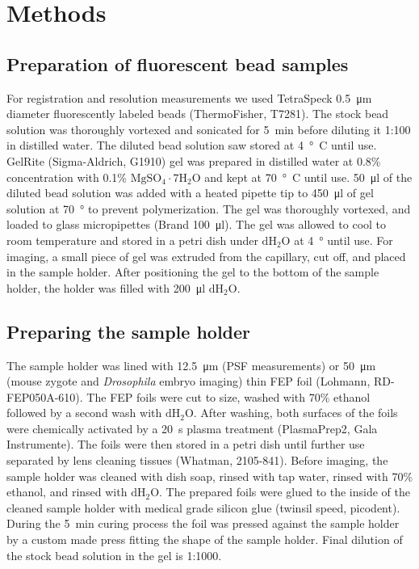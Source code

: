   



\section{Methods}
    \label{sec:methods2}

  \subsection{Preparation of fluorescent bead samples}
    \label{sec:beads}
    For registration and resolution measurements we used TetraSpeck \SI{0.5}{\micro m} diameter fluorescently labeled beads (ThermoFisher, T7281). The stock bead solution was thoroughly vortexed and sonicated for \SI{5}{min} before diluting it 1:100 in distilled water. The diluted bead solution saw stored at \SI{4}{\degree C} until use. GelRite (Sigma-Aldrich, G1910) gel was prepared in distilled water at 0.8\% concentration with 0.1\% $\mathrm{MgSO_4\cdot 7 H_2O}$ and kept at \SI{70}{\degree C} until use. \SI{50}{\micro l} of the diluted bead solution was added with a heated pipette tip to \SI{450}{\micro l} of gel solution at \SI{70}{\degree} to prevent  polymerization. The gel was thoroughly vortexed, and loaded to glass micropipettes (Brand \SI{100}{\micro l}). The gel was allowed to cool to room temperature and stored in a petri dish under $\mathrm{dH_2O}$ at \SI{4}{\degree} until use. For imaging, a small piece of gel was extruded from the capillary, cut off, and placed in the sample holder. After positioning the gel to the bottom of the sample holder, the holder was filled with \SI{200}{\micro l} $\mathrm{dH_2O}$.

  \subsection{Preparing the sample holder}
    The sample holder was lined with \SI{12.5}{\micro m} (PSF measurements) or \SI{50}{\micro m} (mouse zygote and \textit{Drosophila} embryo imaging) thin FEP foil (Lohmann, RD-FEP050A-610). The FEP foils were cut to size, washed with 70\% ethanol followed by a second wash with $\mathrm{dH_2O}$. After washing, both surfaces of the foils were chemically activated by a \SI{20}{s} plasma treatment (PlasmaPrep2, Gala Instrumente). The foils were then stored in a petri dish until further use separated by lens cleaning tissues (Whatman, 2105-841). Before imaging, the sample holder was cleaned with dish soap, rinsed with tap water, rinsed with 70\% ethanol, and rinsed with $\mathrm{dH_2O}$. The prepared foils were glued to the inside of the cleaned sample holder with medical grade silicon glue (twinsil speed, picodent). During the \SI{5}{min} curing process the foil was pressed against the sample holder by a custom made press fitting the shape of the sample holder. Final dilution of the stock bead solution in the gel is 1:1000.


